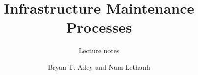 \documentclass[graybox,envcountchap,sectrefs,fleqn]{svmono}
\begin{document}
\author{Bryan T. Adey and Nam Lethanh}
\title{Infrastructure Maintenance Processes}
\subtitle{Lecture notes}
\maketitle

\frontmatter%

%


\tableofcontents

%


\mainmatter%
\setlength{\parskip}{\baselineskip}












\backmatter%
%
%
\printindex

\end{document}
